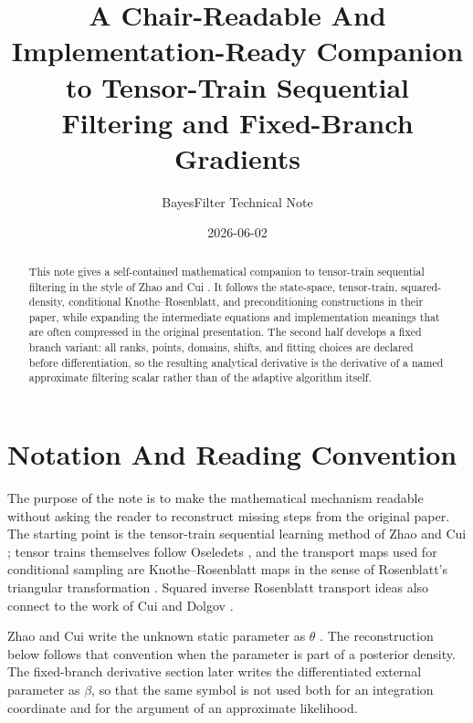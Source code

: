 \documentclass[11pt]{article}
\title{A Chair-Readable And Implementation-Ready Companion to Tensor-Train Sequential Filtering and Fixed-Branch Gradients}
\author{BayesFilter Technical Note}
\date{2026-06-02}
\numberwithin{equation}{section}
\begin{document}
\maketitle

\begin{abstract}
This note gives a self-contained mathematical companion to tensor-train
sequential filtering in the style of Zhao and Cui \cite{zhao2024ttsequential}.
It follows the state-space, tensor-train, squared-density, conditional
Knothe--Rosenblatt, and preconditioning constructions in their paper, while
expanding the intermediate equations and implementation meanings that are often
compressed in the original presentation.  The second half develops a fixed
branch variant: all ranks, points, domains, shifts, and fitting choices are
declared before differentiation, so the resulting analytical derivative is the
derivative of a named approximate filtering scalar rather than of the adaptive
algorithm itself.
\end{abstract}

\tableofcontents

\section{Notation And Reading Convention}

The purpose of the note is to make the mathematical mechanism readable without
asking the reader to reconstruct missing steps from the original paper.  The
starting point is the tensor-train sequential learning method of Zhao and Cui
\cite{zhao2024ttsequential}; tensor trains themselves follow Oseledets
\cite{oseledets2011tt}, and the transport maps used for conditional sampling
are Knothe--Rosenblatt maps in the sense of Rosenblatt's triangular
transformation \cite{rosenblatt1952remarks}.  Squared inverse Rosenblatt
transport ideas also connect to the work of Cui and Dolgov
\cite{cui2021deep}.

Zhao and Cui write the unknown static parameter as \(\theta\)
\cite{zhao2024ttsequential}.  The reconstruction below follows that convention
when the parameter is part of a posterior density.  The fixed-branch derivative
section later writes the differentiated external parameter as \(\beta\), so
that the same symbol is not used both for an integration coordinate and for the
argument of an approximate likelihood.
\end{document}
